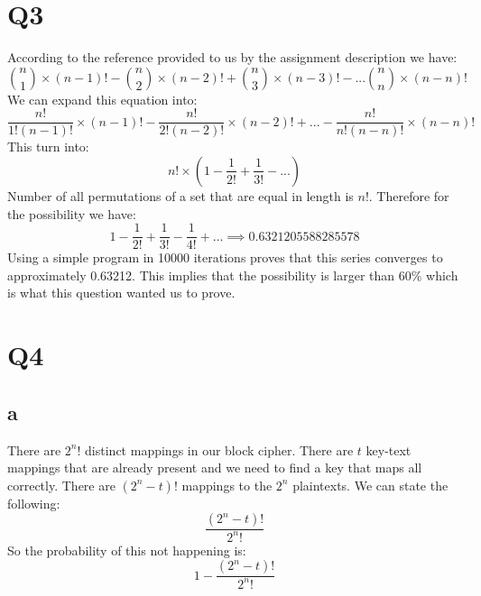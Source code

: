 \documentclass[a4paper, 11pt]{article}
\begin{document}
\section{Q3}
According to the reference provided to us by the assignment description we
have:
\begin{equation}
    \tag{Inclusion-Exclusion Principle}
    {n \choose 1} \times (n-1)! - {n \choose 2}
    \times (n-2)! + {n \choose 3} \times (n-3)! - ... {n \choose n}
    \times (n - n)!
\end{equation}
We can expand this equation into:
\begin{equation}
    \frac{n!}{1!(n-1)!} \times (n-1)! - \frac{n!}{2!(n-2)!} \times (n-2)! +
    ... - \frac{n!}{n!(n-n)!} \times (n-n)!
\end{equation}
This turn into:
\begin{equation}
    n! \times (1 - \frac{1}{2!} + \frac{1}{3!} - ...)
\end{equation}
Number of all permutations of a set that are equal in length is $n!$.
Therefore for the possibility we have:
\begin{equation}
    1 - \frac{1}{2!} + \frac{1}{3!} - \frac{1}{4!} + ... \implies
    0.6321205588285578
\end{equation}
Using a simple program in 10000 iterations proves that this series converges to
approximately 0.63212.
This implies that the possibility is larger than 60\% which is what this
question wanted us to prove.
\section{Q4}
\subsection{a}
There are $2^{n}!$ distinct mappings in our block cipher. There are $t$
key-text mappings that are already present and we need to find a key that
maps all correctly. There are $(2^{n} - t)!$ mappings to the $2^{n}$ plaintexts.
We can state the following: 
\begin{equation}
    \frac{(2^n - t)!}{2^{n}!}
\end{equation}
So the probability of this not happening is:
\begin{equation}
    1 - \frac{(2^n - t)!}{2^{n}!}
\end{equation}
\end{document}
